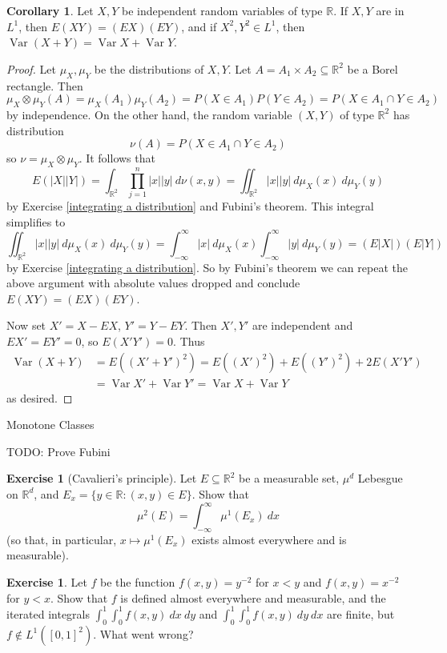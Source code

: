 \documentclass[12pt]{book}
\newcommand{\RR}{\mathbb{R}}
\DeclareMathOperator{\Var}{Var}
\theoremstyle{definition}
\newtheorem{corollary}[theorem]{Corollary}
\newtheorem{exercise}[theorem]{Exercise}
\begin{document}
\begin{corollary}
Let $X,Y$ be independent random variables of type $\RR$. If $X,Y$ are in $L^1$, then $E(XY) = (EX)(EY)$, and if $X^2, Y^2 \in L^1$, then $\Var(X+Y) = \Var X + \Var Y$.
\end{corollary}
\begin{proof}
Let $\mu_X,\mu_Y$ be the distributions of $X,Y$.
Let $A = A_1 \times A_2 \subseteq \RR^2$ be a Borel rectangle.
Then
$$\mu_X \otimes \mu_Y(A) = \mu_X(A_1) \mu_Y(A_2) = P(X \in A_1) P(Y \in A_2) = P(X \in A_1 \cap Y \in A_2)$$
by independence. On the other hand, the random variable $(X, Y)$ of type $\RR^2$ has distribution
$$\nu(A) = P(X \in A_1 \cap Y \in A_2)$$
so $\nu = \mu_X \otimes \mu_Y$.
It follows that
$$E(|X||Y|) = \int_{\RR^2} \prod_{j=1}^n |x||y| ~d\nu(x, y) = \iint_{\RR^2} |x||y| ~d\mu_X(x)~d\mu_Y(y)$$
by Exercise \ref{integrating a distribution} and Fubini's theorem. This integral simplifies to
$$\iint_{\RR^2} |x||y| ~d\mu_X(x)~d\mu_Y(y) = \int_{-\infty}^\infty |x| ~d\mu_X(x) \int_{-\infty}^\infty |y| ~d\mu_Y(y) = (E|X|)(E|Y|)$$
by Exercise \ref{integrating a distribution}.
So by Fubini's theorem we can repeat the above argument with absolute values dropped and conclude $E(XY) = (EX)(EY)$.

Now set $X' = X - EX$, $Y' = Y - EY$. Then $X',Y'$ are independent and $EX' = EY' = 0$, so $E(X'Y') = 0$.
Thus
\begin{align*}\Var(X + Y) &= E((X' + Y')^2) = E((X')^2) + E((Y')^2) + 2E(X'Y') \\
&= \Var X' + \Var Y' = \Var X + \Var Y
\end{align*}
as desired.
\end{proof}

Monotone Classes

TODO: Prove Fubini

\begin{exercise}[Cavalieri's principle]
Let $E \subseteq \RR^2$ be a measurable set, $\mu^d$ Lebesgue on $\RR^d$, and $E_x = \{y \in \RR: (x, y) \in E\}$.
Show that
$$\mu^2(E) = \int_{-\infty}^\infty \mu^1(E_x)~dx$$
(so that, in particular, $x \mapsto \mu^1(E_x)$ exists almost everywhere and is measurable).
\end{exercise}

\begin{exercise}
Let $f$ be the function $f(x, y) = y^{-2}$ for $x < y$ and $f(x, y) = x^{-2}$ for $y < x$.
Show that $f$ is defined almost everywhere and measurable, and the iterated integrals $\int_0^1\int_0^1 f(x,y)~dx~dy$ and $\int_0^1\int_0^1 f(x,y)~dy~dx$ are finite, but $f \notin L^1([0, 1]^2)$.
What went wrong?
\end{exercise}
\end{document}
